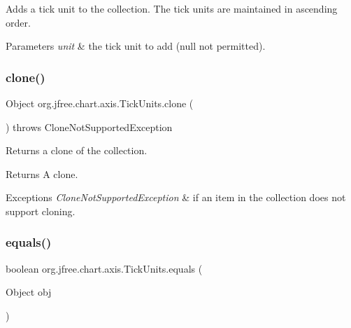 Adds a tick unit to the collection. The tick units are maintained in ascending order.


\begin{DoxyParams}{Parameters}
{\em unit} & the tick unit to add ({\ttfamily null} not permitted). \\
\hline
\end{DoxyParams}
\mbox{\label{classorg_1_1jfree_1_1chart_1_1axis_1_1_tick_units_ac31c970d7e57697a372ccfd97c553bae}} 
\subsubsection{\texorpdfstring{clone()}{clone()}}
{\footnotesize\ttfamily Object org.\+jfree.\+chart.\+axis.\+Tick\+Units.\+clone (\begin{DoxyParamCaption}{ }\end{DoxyParamCaption}) throws Clone\+Not\+Supported\+Exception}

Returns a clone of the collection.

\begin{DoxyReturn}{Returns}
A clone.
\end{DoxyReturn}

\begin{DoxyExceptions}{Exceptions}
{\em Clone\+Not\+Supported\+Exception} & if an item in the collection does not support cloning. \\
\hline
\end{DoxyExceptions}
\mbox{\label{classorg_1_1jfree_1_1chart_1_1axis_1_1_tick_units_a34b1b0e0a0c320f7d9e48dab2e11b9d1}} 
\subsubsection{\texorpdfstring{equals()}{equals()}}
{\footnotesize\ttfamily boolean org.\+jfree.\+chart.\+axis.\+Tick\+Units.\+equals (\begin{DoxyParamCaption}\item[{Object}]{obj }\end{DoxyParamCaption})}

